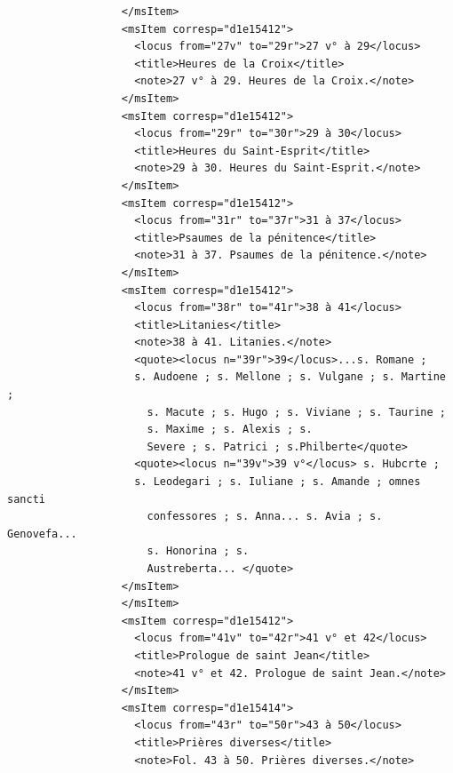 \documentclass[a4paper,12pt,twoside]{book}
\begin{document}
\begin{verbatim}
                  </msItem>
                  <msItem corresp="d1e15412">
                    <locus from="27v" to="29r">27 v° à 29</locus>
                    <title>Heures de la Croix</title>
                    <note>27 v° à 29. Heures de la Croix.</note>
                  </msItem>
                  <msItem corresp="d1e15412">
                    <locus from="29r" to="30r">29 à 30</locus>
                    <title>Heures du Saint-Esprit</title>
                    <note>29 à 30. Heures du Saint-Esprit.</note>
                  </msItem>
                  <msItem corresp="d1e15412">
                    <locus from="31r" to="37r">31 à 37</locus>
                    <title>Psaumes de la pénitence</title>
                    <note>31 à 37. Psaumes de la pénitence.</note>
                  </msItem>
                  <msItem corresp="d1e15412">
                    <locus from="38r" to="41r">38 à 41</locus>
                    <title>Litanies</title>
                    <note>38 à 41. Litanies.</note>
                    <quote><locus n="39r">39</locus>...s. Romane ; 
                    s. Audoene ; s. Mellone ; s. Vulgane ; s. Martine ;
                      s. Macute ; s. Hugo ; s. Viviane ; s. Taurine ;
                      s. Maxime ; s. Alexis ; s.
                      Severe ; s. Patrici ; s.Philberte</quote>
                    <quote><locus n="39v">39 v°</locus> s. Hubcrte ; 
                    s. Leodegari ; s. Iuliane ; s. Amande ; omnes sancti
                      confessores ; s. Anna... s. Avia ; s. Genovefa... 
                      s. Honorina ; s.
                      Austreberta... </quote>
                  </msItem>
                  </msItem>
                  <msItem corresp="d1e15412">
                    <locus from="41v" to="42r">41 v° et 42</locus>
                    <title>Prologue de saint Jean</title>
                    <note>41 v° et 42. Prologue de saint Jean.</note>
                  </msItem>
                  <msItem corresp="d1e15414">
                    <locus from="43r" to="50r">43 à 50</locus>
                    <title>Prières diverses</title>
                    <note>Fol. 43 à 50. Prières diverses.</note>
                    

\end{verbatim}
\end{document}
